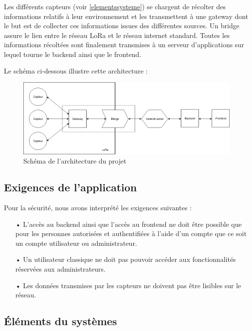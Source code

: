 \documentclass[12pt]{article}
\begin{document}
Les différents capteurs (voir \autoref{elementssysteme}) se chargent de récolter des informations relatifs à leur environnement et les transmettent à une gateway dont le but est de collecter ces informations issues des différentes sources. Un bridge assure le lien entre le réseau LoRa et le réseau internet standard. Toutes les informations récoltées sont finalement transmises à un serveur d'applications sur lequel tourne le backend ainsi que le frontend.

Le schéma ci-dessous illustre cette architecture :

\begin{figure}[h!]
\includegraphics[width=\textwidth]{architecture}
\caption{Schéma de l'architecture du projet}
\end{figure}

\subsection{Exigences de l'application} %

Pour la sécurité, nous avons interprété les exigences suivantes :

\begin{itemize}
\item[•] L'accès au backend ainsi que l'accès au frontend ne doit être possible que pour les personnes autorisées et authentifiées à l'aide d'un compte que ce soit un compte utilisateur ou administrateur.
\item[•] Un utilisateur classique ne doit pas pouvoir accéder aux fonctionnalités réservées aux administrateurs.
\item[•] Les données transmises par les capteurs ne doivent pas être lisibles sur le réseau.
\end{itemize}

\newpage
\subsection{Éléments du systèmes}\label{elementssysteme} %
\end{document}
